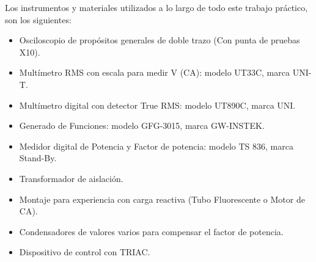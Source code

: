 Los instrumentos y materiales utilizados a lo largo de todo este trabajo práctico, son los siguientes:

\begin{itemize}
    \item Osciloscopio de propósitos generales de doble trazo (Con punta de pruebas X10).
    \item Multímetro RMS con escala para medir V (CA): modelo UT33C, marca UNI-T.
    \item Multímetro digital con detector True RMS: modelo UT890C, marca UNI.
    \item Generado de Funciones: modelo GFG-3015, marca GW-INSTEK.
    \item Medidor digital de Potencia y Factor de potencia: modelo TS 836, marca Stand-By.
    \item Transformador de aislación.
    \item Montaje para experiencia con carga reactiva (Tubo Fluorescente o Motor de CA).
    \item Condensadores de valores varios para compensar el factor de potencia.
    \item Dispositivo de control con TRIAC.
\end{itemize}